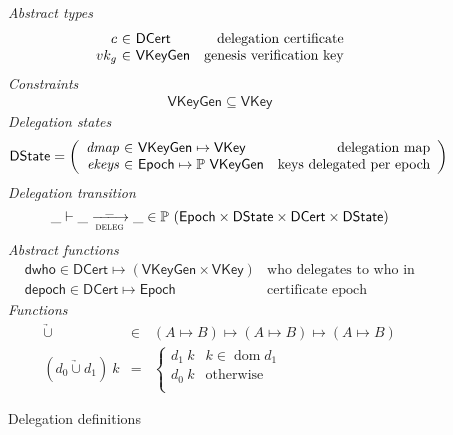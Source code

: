 \documentclass[11pt,a4paper]{article}
\DeclareMathOperator{\dom}{dom}
\newcommand{\powerset}[1]{\mathbb{P}~#1}
\newcommand{\unionoverride}{\mathbin{\underrightarrow\cup}}
\newcommand{\var}[1]{\mathit{#1}}
\newcommand{\fun}[1]{\mathsf{#1}}
\newcommand{\type}[1]{\mathsf{#1}}
\newcommand{\trans}[2]{\xlongrightarrow[\textsc{#1}]{#2}}
\newcommand{\VKey}{\type{VKey}}
\newcommand{\DCert}{\type{DCert}}
\newcommand{\DState}{\type{DState}}
\newcommand{\Epoch}{\type{Epoch}}
\newcommand{\VKeyGen}{\type{VKeyGen}}
\begin{document}
\begin{figure}
  \emph{Abstract types}
  \begin{equation*}
    \begin{array}{r@{~\in~}lr}
      c & \DCert  & \text{delegation certificate}\\
      vk_g & \VKeyGen & \text{genesis verification key}
    \end{array}
  \end{equation*}
  \emph{Constraints}
  \begin{align*}
    \VKeyGen \subseteq \VKey
  \end{align*}
  \emph{Delegation states}
  \begin{equation*}
    \DState =
    \left(\begin{array}{r@{~\in~}lr}
      \var{dmap} & \VKeyGen \mapsto \VKey & \text{delegation map}\\
      \var{ekeys} & \Epoch \mapsto \powerset{\VKeyGen} & \text{keys delegated per epoch}
    \end{array}\right)
  \end{equation*}
  \emph{Delegation transition}
  \begin{equation*}
    \_ \vdash \_ \trans{deleg}{\_} \_ \in
      \powerset (\Epoch \times \DState \times \DCert \times \DState)
  \end{equation*}
  \emph{Abstract functions}
  \begin{align*}
    & \fun{dwho} \in \DCert \mapsto (\VKeyGen \times \VKey) & \text{who delegates to who in the certificate}\\
    & \fun{depoch} \in \DCert \mapsto \Epoch & \text{certificate epoch}
  \end{align*}
  \emph{Functions}
  \begin{equation*}
    \begin{array}{rcl}
      \unionoverride & \in & (A \mapsto B) \mapsto (A \mapsto B) \mapsto (A \mapsto B)\\
      (d_0 \unionoverride d_1)~k & = &
      \begin{cases}
        d_1~k & k \in \dom d_1\\
        d_0~k & \text{otherwise}\\
      \end{cases}
    \end{array}
  \end{equation*}
  \caption{Delegation definitions}
  \label{fig:delegation-defs}
\end{figure}
\end{document}
